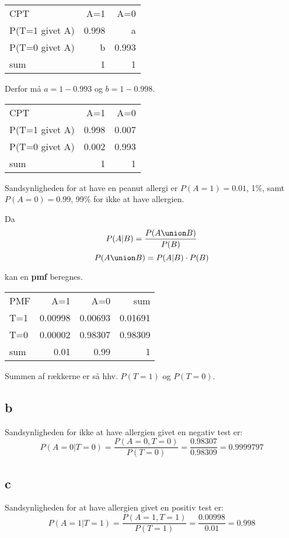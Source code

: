 \documentclass[11pt]{article}
\begin{document}
\begin{center}
\begin{tabular}{lrr}
CPT & A=1 & A=0\\
P(T=1 givet A) & 0.998 & a\\
P(T=0 givet A) & b & 0.993\\
sum & 1 & 1\\
\end{tabular}
\end{center}

Derfor må \(a = 1-0.993\) og \(b=1-0.998\).

\begin{center}
\begin{tabular}{lrr}
CPT & A=1 & A=0\\
P(T=1 givet A) & 0.998 & 0.007\\
P(T=0 givet A) & 0.002 & 0.993\\
sum & 1 & 1\\
\end{tabular}
\end{center}

Sandsynligheden for at have en peanut allergi er \(P(A = 1) = 0.01\), 1\%,
samt \(P(A = 0) = 0.99\), 99\% for ikke at have allergien.

Da
\[P(A|B) = \frac{P(A \union B)}{P(B)}\]
\[P(A \union B) = P(A|B)\cdot P(B)\]

kan en \textbf{pmf} beregnes.

\begin{center}
\begin{tabular}{lrrr}
PMF & A=1 & A=0 & sum\\
T=1 & 0.00998 & 0.00693 & 0.01691\\
T=0 & 0.00002 & 0.98307 & 0.98309\\
sum & 0.01 & 0.99 & 1\\
\end{tabular}
\end{center}

Summen af rækkerne er så hhv. \(P(T=1)\) og \(P(T=0)\).
\subsection{b}
\label{sec:org1986b85}
Sandsynligheden for ikke at have allergien givet en negativ test er:
\[P(A=0|T=0)=\frac{P(A=0,T=0)}{P(T=0)}=\frac{0.98307}{0.98309}= 0.9999797\]
\subsection{c}
\label{sec:org7e349ac}
Sandsynligheden for at have allergien givet en positiv test er:
\[P(A=1|T=1)=\frac{P(A=1,T=1)}{P(T=1)}=\frac{0.00998}{0.01}= 0.998\]
\end{document}
